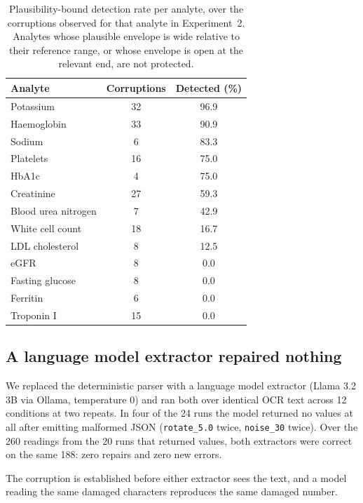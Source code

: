 \documentclass[11pt]{article}
\begin{document}
\begin{table}[t]
\centering
\caption{Plausibility-bound detection rate per analyte, over the corruptions observed for that
analyte in Experiment~2. Analytes whose plausible envelope is wide relative to their reference
range, or whose envelope is open at the relevant end, are not protected.}
\label{tab:peranalyte}
\small
\begin{tabular}{lcc}
\toprule
Analyte & Corruptions & Detected (\%) \\
\midrule
Potassium          & 32 & 96.9 \\
Haemoglobin        & 33 & 90.9 \\
Sodium             & \phantom{0}6 & 83.3 \\
Platelets          & 16 & 75.0 \\
HbA1c              & \phantom{0}4 & 75.0 \\
Creatinine         & 27 & 59.3 \\
Blood urea nitrogen & \phantom{0}7 & 42.9 \\
White cell count   & 18 & 16.7 \\
LDL cholesterol    & \phantom{0}8 & 12.5 \\
eGFR               & \phantom{0}8 & \phantom{0}0.0 \\
Fasting glucose    & \phantom{0}8 & \phantom{0}0.0 \\
Ferritin           & \phantom{0}6 & \phantom{0}0.0 \\
Troponin I         & 15 & \phantom{0}0.0 \\
\bottomrule
\end{tabular}
\end{table}

\subsection{A language model extractor repaired nothing}
\label{sec:llm-extractor}

We replaced the deterministic parser with a language model extractor (Llama 3.2 3B via Ollama,
temperature 0) and ran both over identical OCR text across 12 conditions at two repeats. In
four of the 24 runs the model returned no values at all after emitting malformed JSON
(\texttt{rotate\_5.0} twice, \texttt{noise\_30} twice). Over the 260 readings from the 20 runs
that returned values, both extractors were correct on the same 188: zero repairs and zero new
errors.

The corruption is established before either extractor sees the text, and a model reading the
same damaged characters reproduces the same damaged number.
\end{document}
